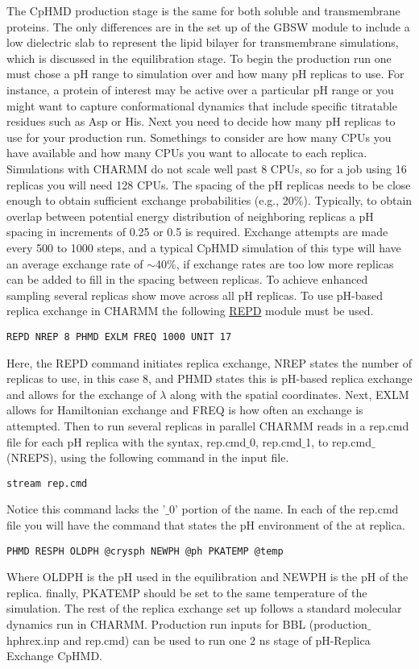 \documentclass[9pt,tutorial]{livecoms}
\begin{document}
The CpHMD production stage is the same for both soluble and transmembrane proteins. 
The only differences are in the set up of the GBSW module to include a low dielectric slab to represent the lipid bilayer for transmembrane simulations, which is discussed in the equilibration stage. 
To begin the production run one must chose a pH range to simulation over and how many 
pH replicas to use. 
For instance, a protein of interest may be active over a particular pH range or you might want to capture conformational dynamics that include specific titratable residues such as Asp or His. 
Next you need to decide how many pH replicas to use for your production run. 
Somethings to consider are how many CPUs you have available and how many CPUs you want to allocate to each replica. 
Simulations with CHARMM do not scale well past 8 CPUs, so for a job using 16 replicas you will need 128 CPUs. 
The spacing of the pH replicas needs to be close enough to obtain sufficient exchange probabilities (e.g., 20$\%$).
Typically, to obtain overlap between potential energy distribution of neighboring replicas a pH spacing in increments of 0.25 or 0.5 is required. 
Exchange attempts are made every 500 to 1000 steps, and a typical CpHMD simulation of this type will have an average exchange rate of $\sim$40$\%$, if exchange rates are too low more replicas can be added to fill in the spacing between replicas.
To achieve enhanced sampling several replicas show move across all pH replicas.
To use pH-based replica exchange in CHARMM the following \href{https://hpc.nih.gov/apps/charmm/c39b2html/repdstr.html}{REPD} module must be used.
%
\begin{lstlisting}
REPD NREP 8 PHMD EXLM FREQ 1000 UNIT 17
\end{lstlisting}
%
Here, the REPD command initiates replica exchange, NREP states the number of replicas to use, in this case 8, and PHMD states this is pH-based replica exchange and allows for the exchange of $\lambda$ along with the spatial coordinates.
Next, EXLM allows for Hamiltonian exchange and FREQ is how often an exchange is attempted. 
Then to run several replicas in parallel CHARMM reads in a rep.cmd file for each pH replica with the syntax, rep.cmd$\_$0, rep.cmd$\_$1, to rep.cmd$\_$(NREPS), using the following command in the input file.
%
\begin{lstlisting}
stream rep.cmd
\end{lstlisting}
% 
Notice this command lacks the '$\_0$' portion of the name.
In each of the rep.cmd file you will have the command that states the pH environment of the at replica.
%
\begin{lstlisting}
PHMD RESPH OLDPH @crysph NEWPH @ph PKATEMP @temp
\end{lstlisting}
%
Where OLDPH is the pH used in the equilibration and NEWPH is the pH of the replica.
finally, PKATEMP should be set to the same temperature of the simulation. 
The rest of the replica exchange set up follows a standard molecular dynamics run in CHARMM.
Production run inputs for BBL (production$\_$hphrex.inp and rep.cmd) can be used to run one 2 ns stage of pH-Replica Exchange CpHMD.
\end{document}
